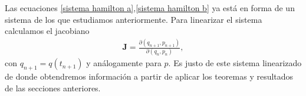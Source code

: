 


Las ecuaciones \eqref{sistema hamilton a},\eqref{sistema hamilton b} ya está en forma de un sistema de los que estudiamos anteriormente. Para linearizar el sistema calculamos el jacobiano
\begin{eqnarray}
\mathbf{J}=\frac{\partial(q_{n+1},p_{n+1})}{\partial(q_{n},p_{n})},
\end{eqnarray}
con $q_{n+1}=q(t_{n+1})$ y análogamente para $p$. Es justo de este sistema linearizado de donde obtendremos información a partir de aplicar los teoremas y resultados de las secciones anteriores. 









